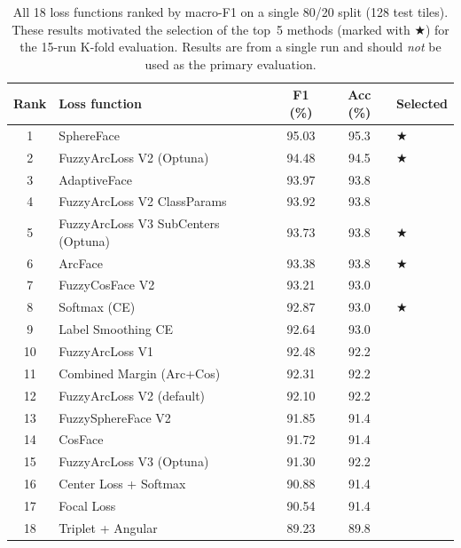\begin{table}[ht!]
\centering
\small
\caption{All 18 loss functions ranked by macro-F1 on a single 80/20
split (128 test tiles).
These results motivated the selection of the top~5 methods
(marked with $\bigstar$) for the 15-run K-fold evaluation.
Results are from a single run and should \emph{not} be used as
the primary evaluation.}
\label{tab:singlerun_all18}
\begin{tabular}{c l c c l}
\hline
\textbf{Rank} & \textbf{Loss function} & \textbf{F1 (\%)} &
\textbf{Acc (\%)} & \textbf{Selected} \\
\hline
1  & SphereFace                          & 95.03 & 95.3 & $\bigstar$ \\
2  & FuzzyArcLoss V2 (Optuna)            & 94.48 & 94.5 & $\bigstar$ \\
3  & AdaptiveFace                        & 93.97 & 93.8 & \\
4  & FuzzyArcLoss V2 ClassParams         & 93.92 & 93.8 & \\
5  & FuzzyArcLoss V3 SubCenters (Optuna) & 93.73 & 93.8 & $\bigstar$ \\
6  & ArcFace                             & 93.38 & 93.8 & $\bigstar$ \\
7  & FuzzyCosFace V2                     & 93.21 & 93.0 & \\
8  & Softmax (CE)                        & 92.87 & 93.0 & $\bigstar$ \\
9  & Label Smoothing CE                  & 92.64 & 93.0 & \\
10 & FuzzyArcLoss V1                     & 92.48 & 92.2 & \\
11 & Combined Margin (Arc+Cos)           & 92.31 & 92.2 & \\
12 & FuzzyArcLoss V2 (default)           & 92.10 & 92.2 & \\
13 & FuzzySphereFace V2                  & 91.85 & 91.4 & \\
14 & CosFace                             & 91.72 & 91.4 & \\
15 & FuzzyArcLoss V3 (Optuna)            & 91.30 & 92.2 & \\
16 & Center Loss + Softmax               & 90.88 & 91.4 & \\
17 & Focal Loss                          & 90.54 & 91.4 & \\
18 & Triplet + Angular                   & 89.23 & 89.8 & \\
\hline
\end{tabular}
\end{table}

